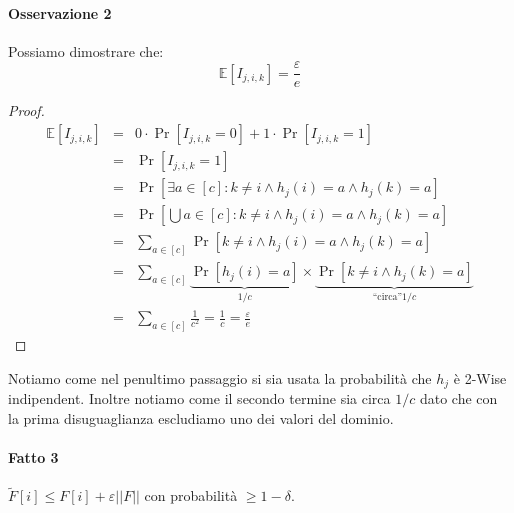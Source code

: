 \documentclass[a4paper,11pt]{book}
\begin{document}
\paragraph{Osservazione 2} Possiamo dimostrare che: $$ \mathbb{E}[I_{j,i,k}] = \frac{\varepsilon}{e}$$
\begin{proof}
\begin{eqnarray}
\mathbb{E}[I_{j,i,k}] & = & 0 \cdot \Pr[I_{j,i,k} = 0] + 1 \cdot \Pr[I_{j,i,k} = 1] \nonumber \\
& = & \Pr[I_{j,i,k} = 1] \nonumber \\
& = & \Pr\left[\exists a \in [c] : k \neq i \wedge h_j (i) = a \wedge  h_j (k) = a \right] \nonumber \\
& = & \Pr\left[\bigcup{a \in [c]} : k \neq i \wedge h_j (i) = a \wedge  h_j (k) = a \right] \nonumber \\
& = & \sum_{a \in [c]}\Pr\left[k \neq i \wedge h_j (i) = a \wedge  h_j (k) = a \right] \nonumber \\
& = & \sum_{a \in [c]}\underbrace{\Pr[h_j (i) = a]}_{1/c} \times \underbrace{\Pr\left[k \neq i \wedge  h_j (k) = a \right]}_{\mbox{``circa''} 1/c} \nonumber \\
& = & \sum_{a \in [c]}\frac{1}{c^2} = \frac{1}{c} = \frac{\varepsilon}{e} \nonumber
\end{eqnarray}
\end{proof}

Notiamo come nel penultimo passaggio si sia usata la probabilit\`a che $h_j$ \`e 2-Wise indipendent. Inoltre notiamo come il secondo termine sia circa $1/c$ dato che con la prima disuguaglianza escludiamo uno dei valori del dominio.

\paragraph{Fatto 3} $\tilde{F}[i] \leq F[i] + \varepsilon ||F|| $ con probabilit\`a $ \geq 1 - \delta$.
\end{document}
